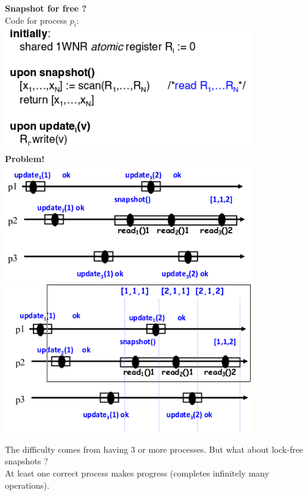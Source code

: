 \documentclass{article}
\theoremstyle{definition}
\begin{document}
\begin{center}
	\large{\textbf{Snapshot for free ?}}\\
	Code for process $p_i$:\\
	\includegraphics[width=0.8\textwidth]{snapshot_free}\\
	\vspace{0.5 cm}
	\large{\textbf{Problem!}}\\
	\includegraphics[width=0.8\textwidth]{snapshot_free_1}\\
	\vspace{0.5 cm}
	\includegraphics[width=0.8\textwidth]{snapshot_free_2}\\
\end{center}

The difficulty comes from having 3 or more processes. But what about lock-free snapshots ? \\
At least one correct process makes progress (completes infinitely many operations).
\end{document}
